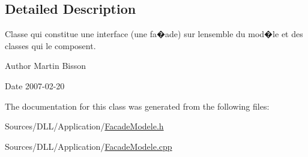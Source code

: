 \subsection{Detailed Description}
Classe qui constitue une interface (une fa�ade) sur l\textquotesingle{}ensemble du mod�le et des classes qui le composent. 

\begin{DoxyAuthor}{Author}
Martin Bisson 
\end{DoxyAuthor}
\begin{DoxyDate}{Date}
2007-\/02-\/20 
\end{DoxyDate}


The documentation for this class was generated from the following files\+:\begin{DoxyCompactItemize}
\item 
Sources/\+D\+L\+L/\+Application/\hyperlink{_facade_modele_8h}{Facade\+Modele.\+h}\item 
Sources/\+D\+L\+L/\+Application/\hyperlink{_facade_modele_8cpp}{Facade\+Modele.\+cpp}\end{DoxyCompactItemize}
